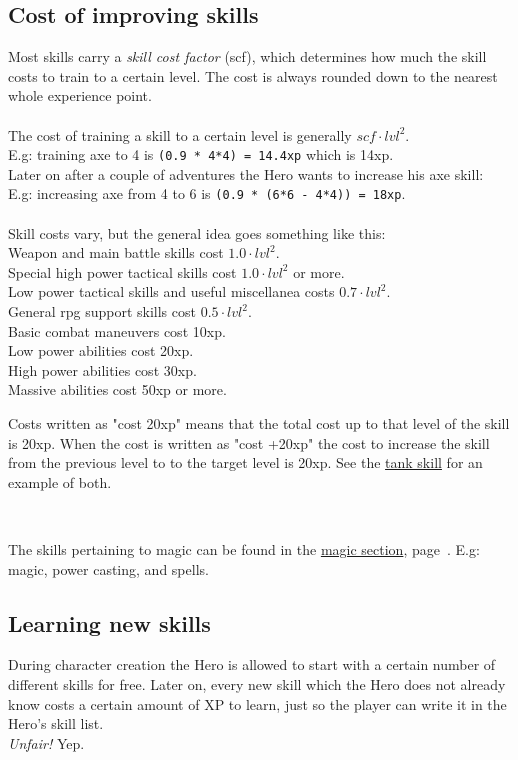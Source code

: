 \subsection*{Cost of improving skills}
Most skills carry a \emph{skill cost factor} (scf), which determines how much the skill costs to train to a certain level. The cost is always rounded down to the nearest whole experience point.\\
\\
The cost of training a skill to a certain level is generally $scf \cdot lvl^2$. \\
E.g: training axe to 4 is \verb|(0.9 * 4*4) = 14.4xp| which is \ca 14xp. \\
Later on after a couple of adventures the Hero wants to increase his axe skill:\\
E.g: increasing axe from 4 to 6 is \verb|(0.9 * (6*6 - 4*4)) = 18xp|. \\
\\
Skill costs vary, but the general idea goes something like this: \\
Weapon and main battle skills cost $1.0 \cdot lvl^2$. \\
Special high power tactical skills cost $1.0 \cdot lvl^2$ or more. \\
Low power tactical skills and useful miscellanea costs $0.7 \cdot lvl^2$. \\
General rpg support skills cost $0.5 \cdot lvl^2$. \\
Basic combat maneuvers cost 10xp. \\
Low power abilities cost 20xp. \\
High power abilities cost 30xp. \\
Massive abilities cost 50xp or more.

Costs written as "cost 20xp" means that the total cost up to that level of the skill is 20xp. When the cost is written as "cost +20xp" the cost to increase the skill from the previous level to to the target level is 20xp. See the \hyperref[skill:tank]{tank skill} for an example of both.

\

The skills pertaining to magic can be found in the \hyperref[cpt:magic]{magic section}, page~\pageref{cpt:magic}.
E.g: magic, power casting, and spells.


\subsection*{Learning new skills}
During character creation the Hero is allowed to start with a certain number of different skills for free. Later on, every new skill which the Hero does not already know costs a certain amount of XP to learn, just so the player can write it in the Hero's skill list.\\
\textit{Unfair!} Yep.

